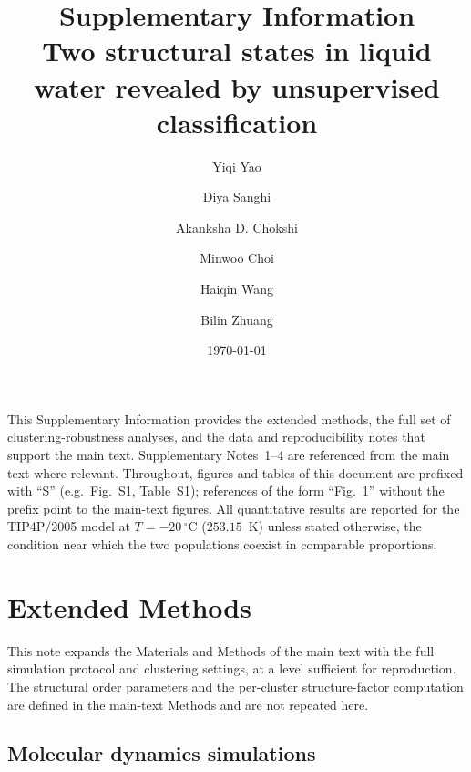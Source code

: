 \documentclass[aps,amsmath,amssymb,onecolumn,superscriptaddress,nofootinbib]{revtex4-2}
\begin{document}
\title{Supplementary Information\\[4pt]
\large Two structural states in liquid water revealed by unsupervised classification}
\author{Yiqi Yao}
\author{Diya Sanghi}
\author{Akanksha D. Chokshi}
\author{Minwoo Choi}
\author{Haiqin Wang}
\author{Bilin Zhuang}
\date{\today}

\maketitle

\noindent
This Supplementary Information provides the extended methods, the full set of
clustering-robustness analyses, and the data and reproducibility notes that
support the main text. Supplementary Notes~1--4 are referenced from the main
text where relevant. Throughout, figures and tables of this document are
prefixed with ``S'' (e.g.\ Fig.~S1, Table~S1); references of the form ``Fig.~1''
without the prefix point to the main-text figures. All quantitative results are
reported for the TIP4P/2005 model at $T=-20\,^{\circ}$C ($253.15$~K) unless
stated otherwise, the condition near which the two populations coexist in
comparable proportions.

\tableofcontents

\section{Extended Methods}
\label{sn:methods}

This note expands the Materials and Methods of the main text with the full
simulation protocol and clustering settings, at a level sufficient for
reproduction. The structural order parameters and the per-cluster
structure-factor computation are defined in the main-text Methods and are not
repeated here.

\subsection{Molecular dynamics simulations}
\label{sn:md}
\end{document}
